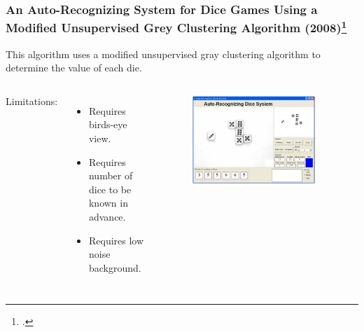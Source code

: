 \documentclass{beamer}
\begin{document}
\begin{frame}
\frametitle{An Auto-Recognizing System for Dice Games Using a Modified Unsupervised Grey Clustering Algorithm (2008)\footcite{Huang2008}}

This algorithm uses a modified unsupervised gray clustering algorithm to determine the value of each die.

\vspace{\baselineskip}

\begin{columns}


Limitations:
\begin{itemize}
	\item Requires birds-eye view.
	\item Requires number of dice to be known in advance.
	\item Requires low noise background.
\end{itemize}


\begin{figure}
	\centering
	\includegraphics[width=0.9\textwidth]{prior_3a}
\end{figure}

\end{columns}
	
\end{frame}
\end{document}
